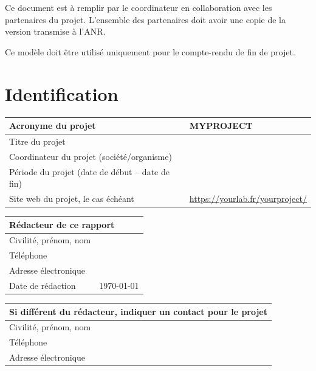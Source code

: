 \documentclass[a4paper,11pt]{article}
\newcommand{\instructions}[1]{%
		{%
			\setlength{\parindent}{0cm}%
			{\em\color{ANRvert}#1}%
		}%
	}
\newcommand{\instructions}[1]{}
\newcommand{\projectName}{MYPROJECT}
\begin{document}
\setcounter{tocdepth}{2}
\tableofcontents{}


\instructions{
\bigskip

Ce document est à remplir par le coordinateur en collaboration avec les partenaires du projet. L'ensemble des partenaires doit avoir une copie de la version transmise à l'ANR.

\bigskip

Ce modèle doit être utilisé uniquement pour le compte-rendu de fin de projet.
}


\section{Identification}


\noindent\begin{tabular}{| p{} | p{} |}
	\hline
	Acronyme du projet & \projectName{} \\
	\hline
	Titre du projet &  \\
	\hline
	Coordinateur du projet (société/organisme) & \\
	\hline
	Période du projet 
	(date de début – date de fin) & \\
	\hline
	Site web du projet, le cas échéant & \url{https://yourlab.fr/yourproject/} \\
	\hline
\end{tabular}

\bigskip

\noindent\begin{tabular}{| p{} | p{} |}
	\hline
	\multicolumn{2}{|l|}{Rédacteur de ce rapport} \\
	\hline
	Civilité, prénom, nom &  \\
	\hline
	Téléphone & \\
	\hline
	Adresse électronique &  \\
	\hline
	Date de rédaction & \today{} \\
	\hline
\end{tabular}

\bigskip

\noindent\begin{tabular}{| p{} | p{} |}
	\hline
	\multicolumn{2}{|l|}{Si différent du rédacteur, indiquer un contact pour le projet} \\
	\hline
	Civilité, prénom, nom &  \\
	\hline
	Téléphone & \\
	\hline
	Adresse électronique &  \\
	\hline
\end{tabular}
\end{document}
